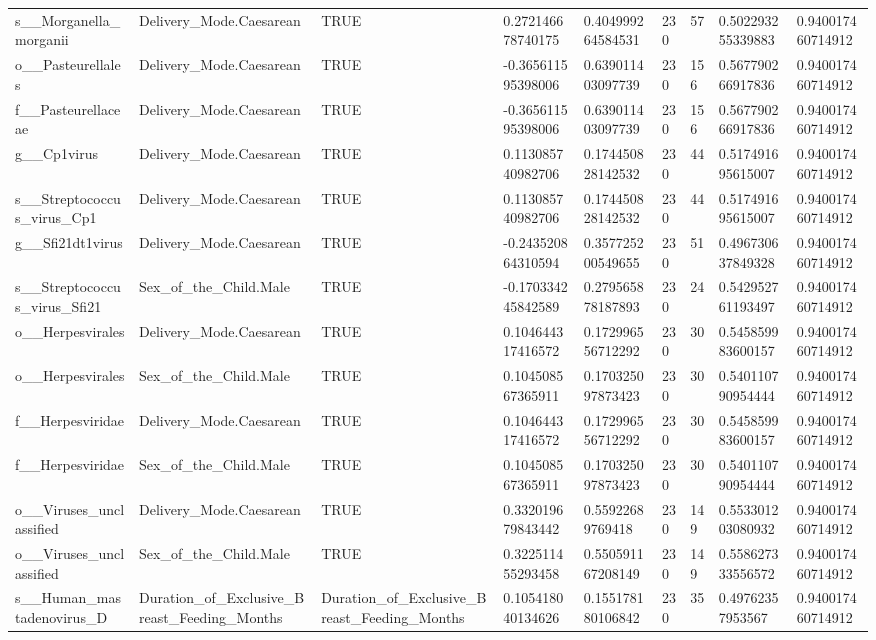 \begin{longtable}{lllllllll}
s\_\_Morganella\_morganii & Delivery\_Mode.Caesarean & TRUE & 0.272146678740175 & 0.404999264584531 & 230 & 57 & 0.502293255339883 & 0.940017460714912 \\
o\_\_Pasteurellales & Delivery\_Mode.Caesarean & TRUE & -0.365611595398006 & 0.639011403097739 & 230 & 156 & 0.567790266917836 & 0.940017460714912 \\
f\_\_Pasteurellaceae & Delivery\_Mode.Caesarean & TRUE & -0.365611595398006 & 0.639011403097739 & 230 & 156 & 0.567790266917836 & 0.940017460714912 \\
g\_\_Cp1virus & Delivery\_Mode.Caesarean & TRUE & 0.113085740982706 & 0.174450828142532 & 230 & 44 & 0.517491695615007 & 0.940017460714912 \\
s\_\_Streptococcus\_virus\_Cp1 & Delivery\_Mode.Caesarean & TRUE & 0.113085740982706 & 0.174450828142532 & 230 & 44 & 0.517491695615007 & 0.940017460714912 \\
g\_\_Sfi21dt1virus & Delivery\_Mode.Caesarean & TRUE & -0.243520864310594 & 0.357725200549655 & 230 & 51 & 0.496730637849328 & 0.940017460714912 \\
s\_\_Streptococcus\_virus\_Sfi21 & Sex\_of\_the\_Child.Male & TRUE & -0.170334245842589 & 0.279565878187893 & 230 & 24 & 0.542952761193497 & 0.940017460714912 \\
o\_\_Herpesvirales & Delivery\_Mode.Caesarean & TRUE & 0.104644317416572 & 0.172996556712292 & 230 & 30 & 0.545859983600157 & 0.940017460714912 \\
o\_\_Herpesvirales & Sex\_of\_the\_Child.Male & TRUE & 0.104508567365911 & 0.170325097873423 & 230 & 30 & 0.540110790954444 & 0.940017460714912 \\
f\_\_Herpesviridae & Delivery\_Mode.Caesarean & TRUE & 0.104644317416572 & 0.172996556712292 & 230 & 30 & 0.545859983600157 & 0.940017460714912 \\
f\_\_Herpesviridae & Sex\_of\_the\_Child.Male & TRUE & 0.104508567365911 & 0.170325097873423 & 230 & 30 & 0.540110790954444 & 0.940017460714912 \\
o\_\_Viruses\_unclassified & Delivery\_Mode.Caesarean & TRUE & 0.332019679843442 & 0.55922689769418 & 230 & 149 & 0.553301203080932 & 0.940017460714912 \\
o\_\_Viruses\_unclassified & Sex\_of\_the\_Child.Male & TRUE & 0.322511455293458 & 0.550591167208149 & 230 & 149 & 0.558627333556572 & 0.940017460714912 \\
s\_\_Human\_mastadenovirus\_D & Duration\_of\_Exclusive\_Breast\_Feeding\_Months & Duration\_of\_Exclusive\_Breast\_Feeding\_Months & 0.105418040134626 & 0.155178180106842 & 230 & 35 & 0.49762357953567 & 0.940017460714912 \\

\end{longtable}
